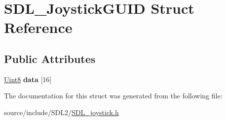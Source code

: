 \hypertarget{struct_s_d_l___joystick_g_u_i_d}{}\section{S\+D\+L\+\_\+\+Joystick\+G\+U\+I\+D Struct Reference}
\label{struct_s_d_l___joystick_g_u_i_d}
\subsection*{Public Attributes}
\begin{DoxyCompactItemize}
\item 
\hypertarget{struct_s_d_l___joystick_g_u_i_d_a16935b928a608fe98e0509f242590597}{}\hyperlink{_s_d_l__stdinc_8h_a2944638813a090aa23e62f4da842c3e2}{Uint8} {\bfseries data} \mbox{[}16\mbox{]}\label{struct_s_d_l___joystick_g_u_i_d_a16935b928a608fe98e0509f242590597}

\end{DoxyCompactItemize}


The documentation for this struct was generated from the following file\+:\begin{DoxyCompactItemize}
\item 
source/include/\+S\+D\+L2/\hyperlink{_s_d_l__joystick_8h}{S\+D\+L\+\_\+joystick.\+h}\end{DoxyCompactItemize}
